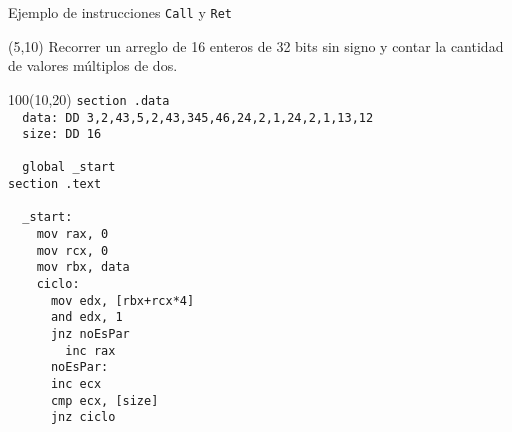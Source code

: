 \documentclass[aspectratio=169]{beamer}
\begin{document}
\begin{frame}[fragile]{Ejemplo de instrucciones \texttt{Call} y \texttt{Ret}}
    \begin{textblock}{80}(5,10) \small Recorrer un arreglo de 16 enteros de 32 bits sin signo y contar la cantidad de valores múltiplos de dos.\end{textblock}
    \begin{textblock}{100}(10,20)
    \scriptsize
    \verb|section .data             |\\ 
    \verb|  data: DD 3,2,43,5,2,43,345,46,24,2,1,24,2,1,13,12|\\ 
    \verb|  size: DD 16             |\\ 
    \verb|                          |\\ 
    \verb|  global _start           |\\ 
    \verb|section .text             |\\ 
    \verb|                          |\\ 
    \verb|  _start:                 |\\ 
    \verb|    mov rax, 0     |  \\ 
    \verb|    mov rcx, 0     |  \\ 
    \verb|    mov rbx, data  |  \\ 
    \verb|    ciclo:                  |\\ 
    \verb|      mov edx, [rbx+rcx*4]  |  \\ 
    \verb|      and edx, 1            |\\ 
    \verb|      jnz noEsPar           |\\ 
    \verb|        inc rax  |  \\  
    \verb|      noEsPar:              |\\ 
    \verb|      inc ecx         |  \\
    \verb|      cmp ecx, [size] |  \\  
    \verb|      jnz ciclo             |\\ 
    \end{textblock}

\end{frame}
\end{document}

